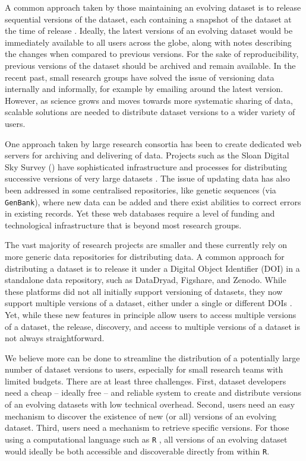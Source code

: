 \documentclass[a4paper,num-refs]{oup-contemporary}
\begin{document}
A common approach taken by those maintaining an evolving dataset is to release sequential versions of the dataset, each containing a snapshot of the dataset at the time of release \cite[e.g.][]{Falster-2015, Pennell-2015a, Yenni-2018, Abolfathi-2018}. Ideally, the latest versions of an evolving dataset would be immediately available to all users across the globe, along with notes describing the changes when compared to previous versions. For the sake of reproducibility, previous versions of the dataset should be archived and remain available. In the recent past, small research groups have solved the issue of versioning data internally and informally, for example by emailing around the latest version. However, as science grows and moves towards more systematic sharing of data, scalable solutions are needed to distribute dataset versions to a wider variety of users.

One approach taken by large research consortia has been to create dedicated web servers for archiving and delivering of data. Projects such as the Sloan Digital Sky Survey () have sophisticated infrastructure and processes for distributing successive versions of very large datasets \cite{Abolfathi-2018}. The issue of updating data has also been addressed in some centralised repositories, like genetic sequences (via \texttt{GenBank}), where new data can be added and there exist abilities to correct errors in existing records. Yet these web databases require a level of funding and technological infrastructure that is beyond most research groups.

The vast majority of research projects are smaller and these currently rely on more generic data repositories for distributing data. A common approach for distributing a dataset is to release it under a Digital Object Identifier (DOI) in a standalone data repository, such as DataDryad, Figshare, and Zenodo. While these platforms did not all initially support versioning of datasets, they now support multiple versions of a dataset, either under a single or different DOIs \cite{Nielsen-2017}. Yet, while these new features in principle allow users to access multiple versions of a dataset, the release, discovery, and access to multiple versions of a dataset is not always straightforward.

We believe more can be done to streamline the distribution of a potentially large number of dataset versions to users, especially for small research teams with limited budgets. There are at least three challenges. First, dataset developers need a cheap -- ideally free -- and reliable system  to create and distribute versions of an evolving datasets with low technical overhead. Second, users need an easy mechanism to discover the existence of new (or all) versions of an evolving dataset. Third, users need a mechanism to retrieve specific versions. For those using a computational language such as \texttt{R} \cite{R-2017}, all versions of an evolving dataset would ideally be both accessible and discoverable directly from within \texttt{R}.
\end{document}
